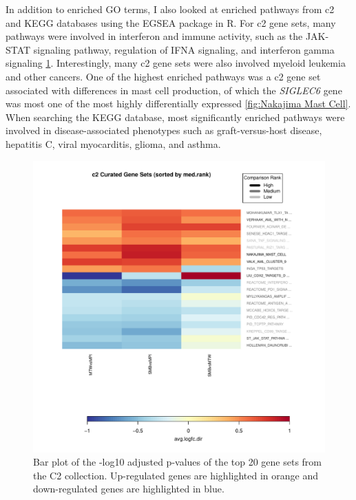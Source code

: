 \documentclass[12pt,a4paper,titlepage,twoside,openright]{book}
\begin{document}
\begin{mainmatter}
{{In addition to enriched GO terms, I also looked at enriched pathways from c2 and KEGG databases using the EGSEA package in R. For c2 gene sets, many pathways were involved in interferon and immune activity, such as the JAK-STAT signaling pathway, regulation of IFNA signaling, and interferon gamma signaling \ref{fig:c2 Heatmap}. Interestingly, many c2 gene sets were also involved myeloid leukemia and other cancers. One of the highest enriched pathways was a c2 gene set associated with differences in mast cell production, of which the \textit{SIGLEC6} gene was most one of the most highly differentially expressed \ref{fig:Nakajima Mast Cell}. When searching the KEGG database, most significantly enriched pathways were involved in disease-associated phenotypes such as graft-versus-host disease, hepatitis C, viral myocarditis, glioma, and asthma. 

\begin{figure}[htb!]
\centering
\includegraphics[width=\textwidth,height=\textheight,keepaspectratio]{Figures/summary_heatmaps_c2.pdf}
\caption{Bar plot of the -log10 adjusted p-values of the top 20 gene sets from the C2 collection. Up-regulated genes are highlighted in orange and down-regulated genes are highlighted in blue.}
\label{fig:c2 Heatmap}
\end{figure}

}}
\end{mainmatter}
\end{document}
